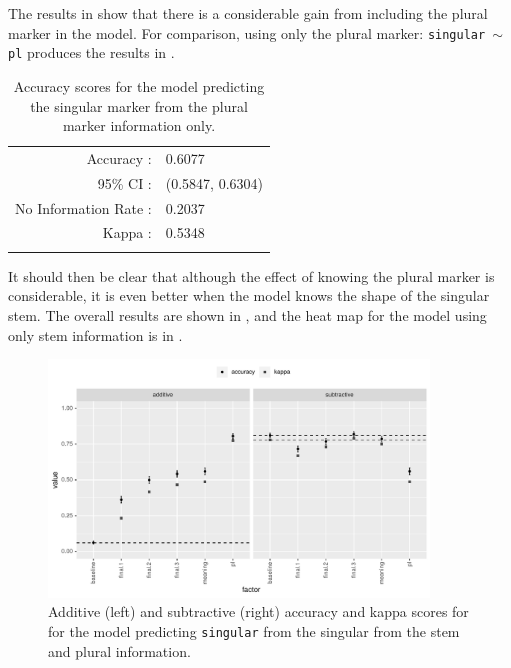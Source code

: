 The results in  show that there is a considerable gain from including the plural marker in the model. For comparison, using only the plural marker: \texttt{singular $\sim$ pl} produces the results in .

\begin{table}[!htpb]
  \centering
  \begin{tabular}{rl}
    \lsptoprule
    \multicolumn{2}{c}{Overall Statistics}   \\
    \midrule
    Accuracy :            & 0.6077           \\
    95\% CI :             & (0.5847, 0.6304) \\
    No Information Rate : & 0.2037           \\
    Kappa :               & 0.5348           \\
    \lspbottomrule
  \end{tabular}
  \caption{Accuracy scores for the model predicting the singular marker from the plural marker information only.}\label{tab:sg-marker-pl}
\end{table}

It should then be clear that although the effect of knowing the plural marker is considerable, it is even better when the model knows the shape of the singular stem. The overall results are shown in , and the heat map for the model using only stem information is in .

\begin{figure}[!htpb]
  \centering
  \includegraphics[width=0.9\textwidth]{./figures/kasem/p-fi-sgmark-sg-overall.pdf}
  \caption{Additive (left) and subtractive (right) accuracy and kappa scores for for the model predicting \texttt{singular} from the singular from the stem and plural information.}\label{fig:overall-fi-singular-sg}
\end{figure}

